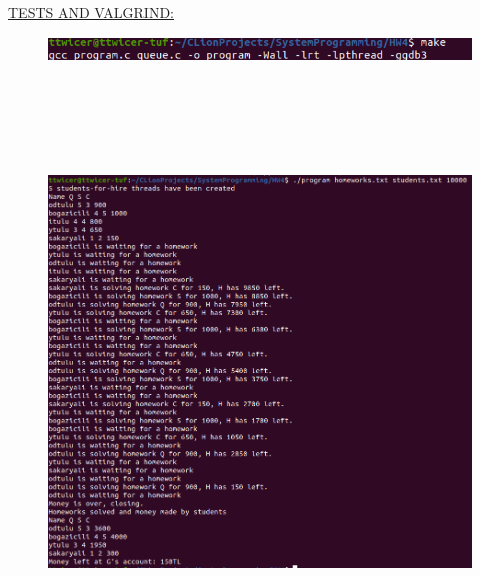 \documentclass[12pt]{report}
\renewcommand{\_}{\kern-1.5pt\textunderscore\kern-1.5pt}
\begin{document}
\vspace{\baselineskip}
\newpage
\begin{justify}
{\fontsize{16pt}{19.2pt}\selectfont \uline{TESTS AND VALGRIND:}}
\end{justify}



\begin{figure}[H]
	\begin{Center}
		\includegraphics[width=5.0in,height=0.26in]{./image1.png}
	\end{Center}
\end{figure}




\vspace{\baselineskip}


\begin{figure}[H]
	\begin{Center}
		\includegraphics[width=6.55in,height=6.07in]{./image2.png}
	\end{Center}
\end{figure}
\end{document}
